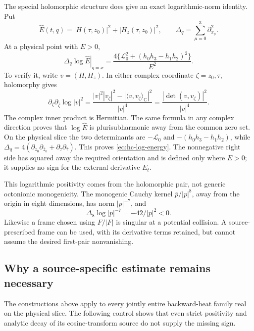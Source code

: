 \documentclass[11pt]{article}
\numberwithin{equation}{section}
\theoremstyle{definition}
\theoremstyle{remark}
\newcommand{\C}{\mathbb C}
\newcommand{\Lag}{\mathcal L}
\begin{document}
The special holomorphic structure does give an exact logarithmic-norm
identity.  Put
\[
 \widehat E(t,q)=|H(\tau,z_0)|^2+|H_z(\tau,z_0)|^2,
 \qquad \Delta_q=\sum_{\mu=0}^3\partial_{x_\mu}^2.
\]
At a physical point with \(E>0\),
\begin{equation}
 \left.\Delta_q\log\widehat E\right|_{q=x}
 =\frac{4\{\Lag_0^2+(h_0h_3-h_1h_2)^2\}}{E^2}.
 \label{eq:hc-log-energy}
\end{equation}
To verify it, write \(v=(H,H_z)\).  In either complex coordinate
\(\zeta=z_0,\tau\), holomorphy gives
\[
 \partial_\zeta\partial_{\bar\zeta}\log|v|^2
 =\frac{|v|^2|v_\zeta|^2-|\langle v,v_\zeta\rangle_{\C}|^2}
        {|v|^4}
 =\frac{|\det(v,v_\zeta)|^2}{|v|^4}.
\]
The complex inner product is Hermitian. The same formula in any complex
direction proves that \(\log\widehat E\) is plurisubharmonic away
from the common zero set. On the physical slice the two
determinants are \(-\Lag_0\) and
\(-(h_0h_3-h_1h_2)\), while
\(\Delta_q=4(\partial_{z_0}\partial_{\bar z_0}
                   +\partial_\tau\partial_{\bar\tau})\).
This proves \eqref{eq:hc-log-energy}.  The nonnegative right side has
squared away the required orientation and is defined only where
\(E>0\); it supplies no sign for the external derivative \(E_t\).

This logarithmic positivity comes from the holomorphic pair, not
generic octonionic monogenicity.  The monogenic Cauchy kernel
\(\bar p/|p|^8\), away from the origin in eight dimensions, has norm
\(|p|^{-7}\), and
\[
 \Delta_8\log|p|^{-7}=-42/|p|^2<0.
\]
Likewise a frame chosen using \(F/|F|\) is singular at a potential
collision.  A source-prescribed frame can be used, with its derivative
terms retained, but cannot assume the desired first-pair nonvanishing.

\subsection{Why a source-specific estimate remains necessary}

The constructions above apply to every jointly entire backward-heat
family real on the physical slice. The following control shows that
even strict positivity and analytic decay of its cosine-transform source
do not supply the missing sign.
\end{document}
